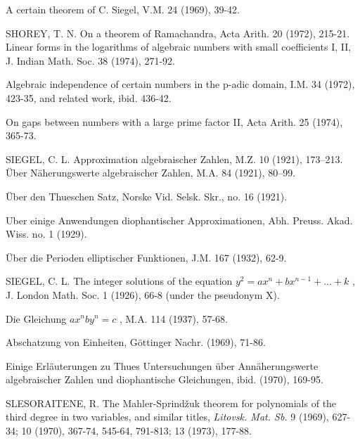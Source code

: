 \begin{hanglist}
    \item \hspace{1.5em} A certain theorem of C. Siegel, V.M. 24 (1969), 39-42.
    \item SHOREY, T. N. On a theorem of Ramachandra, Acta Arith. 20 (1972), 215-21. Linear forms in the logarithms of algebraic numbers with small coefficients I, II, J. Indian Math. Soc. 38 (1974), 271-92.
    \item \hspace{1.5em} Algebraic independence of certain numbers in the p-adic domain, I.M. 34 (1972), 423-35, and related work, ibid. 436-42.
    \item \hspace{1.5em} On gaps between numbers with a large prime factor II, Acta Arith. 25 (1974), 365-73.
    \item SIEGEL, C. L. Approximation algebraischer Zahlen, M.Z. 10 (1921), 173–213. Über Näherungswerte algebraischer Zahlen, M.A. 84 (1921), 80–99.
    \item \hspace{1.5em} Über den Thueschen Satz, Norske Vid. Selsk. Skr., no. 16 (1921).
    \item \hspace{1.5em} Uber einige Anwendungen diophantischer Approximationen, Abh. Preuss. Akad. Wiss. no. 1 (1929).
    \item \hspace{1.5em} Über die Perioden elliptischer Funktionen, J.M. 167 (1932), 62-9.
    \item SIEGEL, C. L. The integer solutions of the equation  $y^2 = ax^n + bx^{n-1} + ... + k$ , J. London Math. Soc. 1 (1926), 66-8 (under the pseudonym X).
    \item \hspace{1.5em} Die Gleichung  $ax^n by^n = c$ , M.A. 114 (1937), 57-68.
    \item \hspace{1.5em} Abschatzung von Einheiten, Göttinger Nachr. (1969), 71-86.
    \item \hspace{1.5em} Einige Erläuterungen zu Thues Untersuchungen über Annäherungswerte algebraischer Zahlen und diophantische Gleichungen, ibid. (1970), 169-95.
    \item SLESORAITENE, R. The Mahler-Sprindžuk theorem for polynomials of the third degree in two variables, and similar titles, \textit{Litovsk. Mat. Sb.} 9 (1969), 627-34; 10 (1970), 367-74, 545-64, 791-813; 13 (1973), 177-88.

\end{hanglist}
